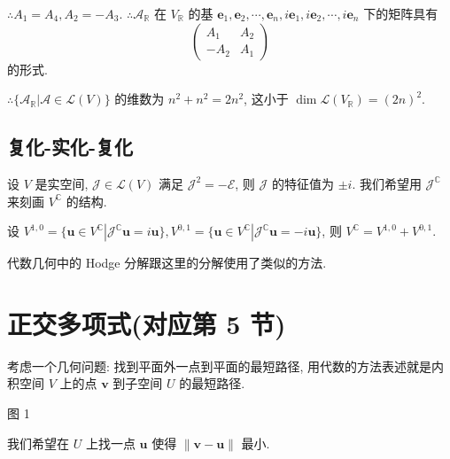 \documentclass[color=black,device=normal,lang=cn,mode=geye]{elegantnote}
\begin{document}
$\therefore A_1=A_4,A_2=-A_3$. $\therefore\mathcal{A}_\mathbb{R}$ 在 $V_\mathbb{R}$ 的基 $\boldsymbol{e}_1,\boldsymbol{e}_2,\cdots,\boldsymbol{e}_n,i\boldsymbol{e}_1,i\boldsymbol{e}_2,\cdots,i\boldsymbol{e}_n$ 下的矩阵具有
\[\begin{pmatrix}
    A_1 & A_2 \\
    -A_2 & A_1
\end{pmatrix}\]
的形式.  %

$\therefore\{\mathcal{A}_\mathbb{R}|\mathcal{A}\in\mathcal{L}(V)\}$ 的维数为 $n^2+n^2=2n^2$, 这小于 $\dim\mathcal{L}(V_\mathbb{R})=(2n)^2$.
\subsection{复化-实化-复化}
设 $V$ 是实空间, $\mathcal{J}\in\mathcal{L}(V)$ 满足 $\mathcal{J}^2=-\mathcal{E}$, 则 $\mathcal{J}$ 的特征值为 $\pm i$. 我们希望用 $\mathcal{J}^\mathbb{C}$ 来刻画 $V^\mathbb{C}$ 的结构.

设 $V^{1,0}=\{\boldsymbol{u}\in V^\mathbb{C}|\mathcal{J}^\mathbb{C}\boldsymbol{u}=i\boldsymbol{u}\},V^{0,1}=\{\boldsymbol{u}\in V^\mathbb{C}|\mathcal{J}^\mathbb{C}\boldsymbol{u}=-i\boldsymbol{u}\}$, 则 $V^\mathbb{C}=V^{1,0}+V^{0,1}$.

代数几何中的 Hodge 分解跟这里的分解使用了类似的方法.
\section{正交多项式(对应第 5 节)}
考虑一个几何问题: 找到平面外一点到平面的最短路径, 用代数的方法表述就是内积空间 $V$ 上的点 $\boldsymbol{v}$ 到子空间 $U$ 的最短路径.
\begin{center}

    图 1
\end{center}

我们希望在 $U$ 上找一点 $\boldsymbol{u}$ 使得 $\|\boldsymbol{v}-\boldsymbol{u}\|$ 最小.
\end{document}
